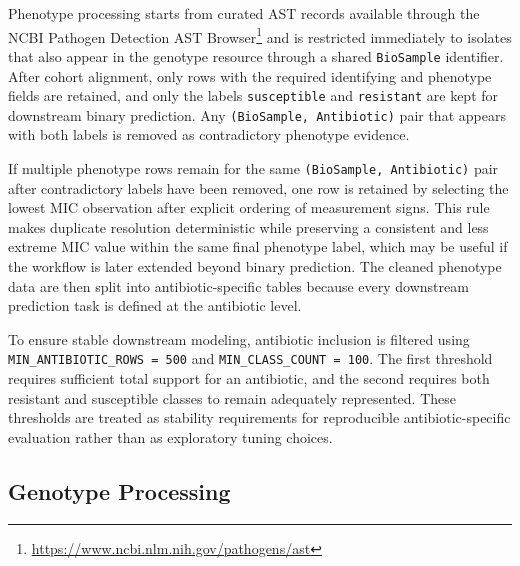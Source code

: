 Phenotype processing starts from curated AST records available through the NCBI Pathogen Detection AST Browser\footnote{\url{https://www.ncbi.nlm.nih.gov/pathogens/ast}} and is restricted immediately to isolates that also appear in the genotype resource through a shared \texttt{BioSample} identifier. After cohort alignment, only rows with the required identifying and phenotype fields are retained, and only the labels \texttt{susceptible} and \texttt{resistant} are kept for downstream binary prediction. Any \texttt{(BioSample, Antibiotic)} pair that appears with both labels is removed as contradictory phenotype evidence.

If multiple phenotype rows remain for the same \texttt{(BioSample, Antibiotic)} pair after contradictory labels have been removed, one row is retained by selecting the lowest MIC observation after explicit ordering of measurement signs. This rule makes duplicate resolution deterministic while preserving a consistent and less extreme MIC value within the same final phenotype label, which may be useful if the workflow is later extended beyond binary prediction. The cleaned phenotype data are then split into antibiotic-specific tables because every downstream prediction task is defined at the antibiotic level.

To ensure stable downstream modeling, antibiotic inclusion is filtered using \texttt{MIN\_ANTIBIOTIC\_ROWS = 500} and \texttt{MIN\_CLASS\_COUNT = 100}. The first threshold requires sufficient total support for an antibiotic, and the second requires both resistant and susceptible classes to remain adequately represented. These thresholds are treated as stability requirements for reproducible antibiotic-specific evaluation rather than as exploratory tuning choices.

\subsection{Genotype Processing}

